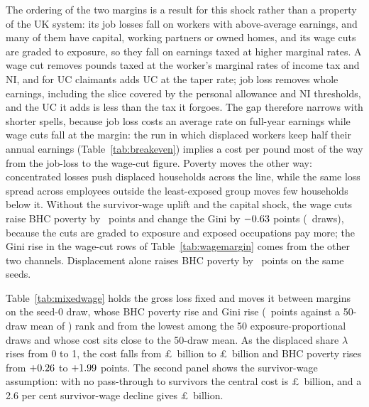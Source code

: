 The ordering of the two margins is a result for this shock rather than a property of the UK system: its job losses fall on workers with above-average earnings, and many of them have capital, working partners or owned homes, and its wage cuts are graded to exposure, so they fall on earnings taxed at higher marginal rates. A wage cut removes pounds taxed at the worker's marginal rates of income tax and NI, and for UC claimants adds UC at the taper rate; job loss removes whole earnings, including the slice covered by the personal allowance and NI thresholds, and the UC it adds is less than the tax it forgoes. The gap therefore narrows with shorter spells, because job loss costs an average rate on full-year earnings while wage cuts fall at the margin: the run in which displaced workers keep half their annual earnings (Table~\ref{tab:breakeven}) implies a cost per pound most of the way from the job-loss to the wage-cut figure. Poverty moves the other way: concentrated losses push displaced households across the line, while the same loss spread across employees outside the least-exposed group moves few households below it. Without the survivor-wage uplift and the capital shock, the wage cuts raise BHC poverty by \genWcCutOnlyPovBhcMeanPp~points and change the Gini by $-0.63$ points (\genWcDraws~draws), because the cuts are graded to exposure and exposed occupations pay more; the Gini rise in the wage-cut rows of Table~\ref{tab:wagemargin} comes from the other two channels. Displacement alone raises BHC poverty by \genChannelMcDispPovBhcAbsPp~points on the same seeds.

Table~\ref{tab:mixedwage} holds the gross loss fixed and moves it between margins on the seed-0 draw, whose BHC poverty rise and Gini rise (\genSeedZeroExposureGiniPp~points against a 50-draw mean of \genCentralMcGiniMeanPp) rank \genSeedZeroRankPovBhc{} and \genSeedZeroRankGini{} from the lowest among the 50 exposure-proportional draws and whose cost sits close to the 50-draw mean. As the displaced share $\lambda$ rises from 0 to 1, the cost falls from \pounds\genMixedZeroCostBn~billion to \pounds\genMixedOneCostBn~billion and BHC poverty rises from $+0.26$ to $+1.99$ points. The second panel shows the survivor-wage assumption: with no pass-through to survivors the central cost is \pounds\genSurvivorZeroCostBn~billion, and a 2.6 per cent survivor-wage decline gives \pounds\genSurvivorMinusTwoCostBn~billion.

